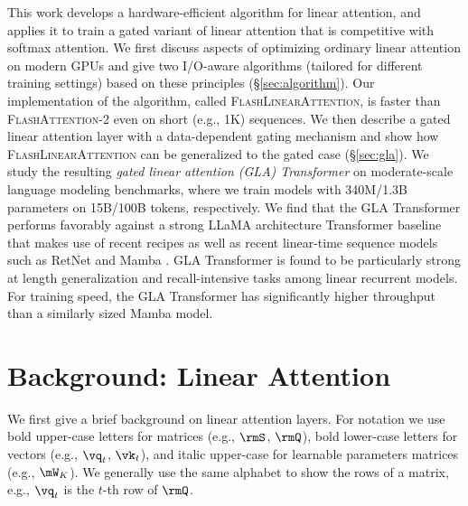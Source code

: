This work develops a hardware-efficient algorithm for linear attention, and applies it to train a gated variant of linear attention that is competitive with softmax attention. We first discuss  aspects of optimizing ordinary linear attention on modern GPUs  and give two I/O-aware algorithms (tailored for different training settings) based on these principles (\S\ref{sec:algorithm}). Our implementation of the algorithm, called \textsc{FlashLinearAttention}, is faster than \textsc{FlashAttention-2} \citep{flashattention2} even on short (e.g., 1K) sequences. 
We then describe a gated linear attention layer with a data-dependent gating mechanism and show how \textsc{FlashLinearAttention} can be generalized to the gated case (\S\ref{sec:gla}). 
We study the resulting \emph{gated linear attention (GLA) Transformer} on moderate-scale language modeling benchmarks, where we train models with 340M/1.3B parameters on 15B/100B tokens, respectively. We find that the GLA Transformer performs favorably against a strong LLaMA architecture Transformer baseline that makes use of recent recipes \citep[Transformer++;][]{touvron2023llama} as well as recent linear-time sequence models such as RetNet \cite{sun2023retentive} and Mamba \citep{Gu2023MambaLS}. GLA Transformer is found to be particularly strong at length generalization and recall-intensive tasks among linear recurrent models. For training speed,  the GLA Transformer has significantly  higher throughput than a similarly sized Mamba model.

\vspace{-3mm}
\section{Background: Linear Attention}
\vspace{-3mm}
We first give a brief background on linear attention layers. For notation we  use bold upper-case letters for matrices (e.g., $\rmS$, $\rmQ$),  bold lower-case letters  for vectors (e.g., $\vq_t$, $\vk_t$), and italic upper-case  for learnable parameters matrices (e.g., $\mW_K$). We generally use the same alphabet to show the rows of a matrix, e.g., $\vq_t$ is the $t$-th row of $\rmQ$.

\label{sec:background}
\vspace{-2mm}
